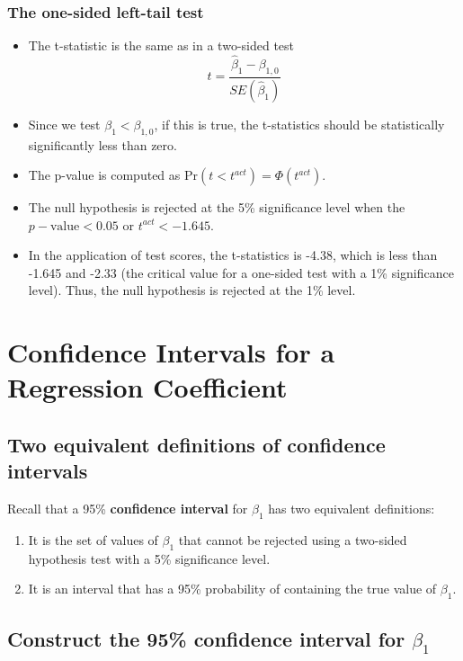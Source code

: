 \documentclass[a4paper,11pt]{article}
\newcommand{\pr}{\mathrm{Pr}}
\begin{document}
\subsubsection*{The one-sided left-tail test}
\label{sec:org5ae5f23}

\begin{itemize}
\item The t-statistic is the same as in a two-sided test
\[ t = \frac{\hat{\beta}_1 - \beta_{1,0}}{SE(\hat{\beta}_1)} \]
\item Since we test \(\beta_1 < \beta_{1,0}\), if this is true, the
t-statistics should be statistically significantly less than zero.
\item The p-value is computed as \(\pr(t < t^{act}) = \varPhi(t^{act})\).
\item The null hypothesis is rejected at the 5\% significance level when
the \(p-\text{value} < 0.05\) or \(t^{act} < -1.645\).
\item In the application of test scores, the t-statistics is -4.38, which
is less than -1.645 and -2.33 (the critical value for a one-sided
test with a 1\% significance level). Thus, the null hypothesis is
rejected at the 1\% level.
\end{itemize}


\section{Confidence Intervals for a Regression Coefficient}
\label{sec:orgbc954ab}

\subsection{Two equivalent definitions of confidence intervals}
\label{sec:orgf6e74b5}

Recall that a 95\% \textbf{confidence interval} for \(\beta_1\) has two equivalent
definitions:
\begin{enumerate}
\item It is the set of values of \(\beta_1\) that cannot be rejected using
a two-sided hypothesis test with a 5\% significance level.
\item It is an interval that has a 95\% probability of containing the true
value of \(\beta_1\).
\end{enumerate}


\subsection{Construct the 95\% confidence interval for \(\beta_1\)}
\label{sec:orgb0f1ba3}
\end{document}
